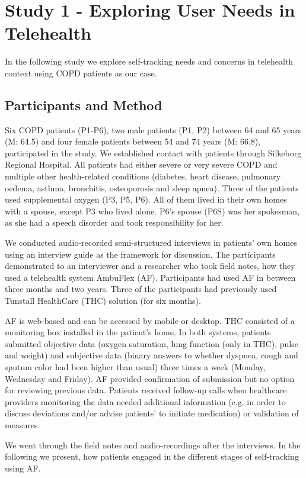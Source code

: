 \section{Study 1 - Exploring User Needs in Telehealth}
In the following study we explore self-tracking needs and concerns in telehealth context using COPD patients as our case. 

\subsection{Participants and Method} 
Six COPD patients (P1-P6), two male patients (P1, P2) between 64 and 65 years (M: 64.5) and four female patients between 54 and 74 years (M: 66.8), participated in the study. We established contact with patients through Silkeborg Regional Hospital. All patients had either severe or very severe COPD and multiple other health-related conditions (diabetes, heart disease, pulmonary oedema, asthma, bronchitis, osteoporosis and sleep apnea). Three of the patients used supplemental oxygen (P3, P5, P6). All of them lived in their own homes with a spouse, except P3 who lived alone. P6's spouse (P6S) was her spokesman, as she had a speech disorder and took responsibility for her. 

We conducted audio-recorded semi-structured interviews in patients' own homes using an interview guide as the framework for discussion. The participants demonstrated to an interviewer and a researcher who took field notes, how they used a telehealth system AmbuFlex (AF). Participants had used AF in between three months and two years. Three of the participants had previously used Tunstall HealthCare (THC) solution (for six months). 

AF is web-based and can be accessed by mobile or desktop. THC consisted of a monitoring box installed in the patient's home. In both systems, patients submitted objective data (oxygen saturation, lung function (only in THC), pulse and weight) and subjective data (binary answers to whether dyspnea, cough and sputum color had been higher than usual) three times a week (Monday, Wednesday and Friday). AF provided confirmation of submission but no option for reviewing previous data. Patients received follow-up calls when healthcare providers monitoring the data needed additional information (e.g. in order to discuss deviations and/or advise patients' to initiate medication) or validation of measures. 

We went through the field notes and audio-recordings after the interviews. In the following we present, how patients engaged in the different stages of self-tracking using AF. 

